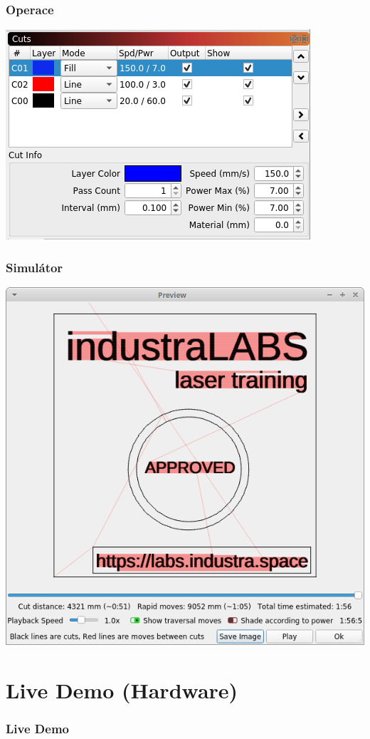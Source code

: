 \documentclass[14pt]{beamer}
\begin{document}
\begin{frame}
\frametitle{Operace}
\centering
\includegraphics[scale=0.7]{imgs/lb_colors.png}

\end{frame}

\begin{frame}
\frametitle{Simulátor}
\centering
\includegraphics[scale=0.35]{imgs/lb_simulator.png}

\end{frame}






\section{Live Demo (Hardware)}
\begin{frame}
\frametitle{Live Demo}
\centering
\scalebox{13}{$\leftarrow$}


\end{frame}
\end{document}
